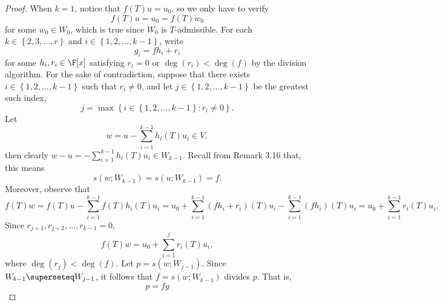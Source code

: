 \documentclass[linearalgebraII]{subfiles}
\begin{document}
    \begin{proof}
        When $k=1$, notice that $f(T)u=u_0$, so we only have to verify
        \begin{equation*}
            f(T)u = u_0 = f(T)w_0
        \end{equation*}
        for some $w_0\in W_0$, which is true since $W_0$ is $T$-admissible. For each $k\in \left\lbrace 2,3,\ldots,r \right\rbrace$ and $i\in\left\lbrace 1,2,\ldots,k-1 \right\rbrace$, write
        \begin{equation*}
            g_i = fh_i+r_i
        \end{equation*}
        for some $h_i,r_i\in\F[x]$ satisfying $r_i=0$ or $\deg(r_i)<\deg(f)$ by the division algorithm. For the sake of contradiction, suppose that there exists $i\in \left\lbrace 1,2,\ldots,k-1 \right\rbrace$ such that $r_i\neq 0$, and let $j\in\left\lbrace 1,2,\ldots,k-1 \right\rbrace$ be the greatest such index,
        \begin{equation*}
            j = \max\left\lbrace i\in\left\lbrace 1,2,\ldots,k-1 \right\rbrace :r_i\neq 0 \right\rbrace .
        \end{equation*}
        Let
        \begin{equation*}
            w = u - \sum^{k-1}_{i=1} h_i(T)u_i\in V,
        \end{equation*}
        then clearly $w-u = -\sum^{k-1}_{i=1} h_i(T)u_i\in W_{k-1}$. Recall from Remark 3.16 that, this means
        \begin{equation*}
            s(w;W_{k-1}) = s(u;W_{k-1}) = f.
        \end{equation*}
        Moreover, observe that
        \begin{equation*}
            f(T)w = f(T)u - \sum^{k-1}_{i=1} f(T)h_i(T)u_i = u_0 + \sum^{k-1}_{i=1} \left( fh_i+r_i \right) (T)u_i - \sum^{k-1}_{i=1} \left( fh_i \right) (T)u_i = u_0 + \sum^{k-1}_{i=1} r_i(T)u_i.
        \end{equation*}
        Since $r_{j+1}, r_{j+2}, \ldots, r_{k-1}=0$,
        \begin{equation*}
            f(T)w = u_0 + \sum^{j}_{i=1} r_i(T)u_i,
        \end{equation*}
        where $\deg\left(r_j\right)<\deg(f)$. Let $p=s\left( w;W_{j-1} \right) $. Since $W_{k-1}\superseteq W_{j-1}$, it follows that $f = s\left( w;W_{k-1} \right) $ divides $p$. That is,
        \begin{equation*}
            p = fg
        \end{equation*}

\end{proof}
\end{document}
